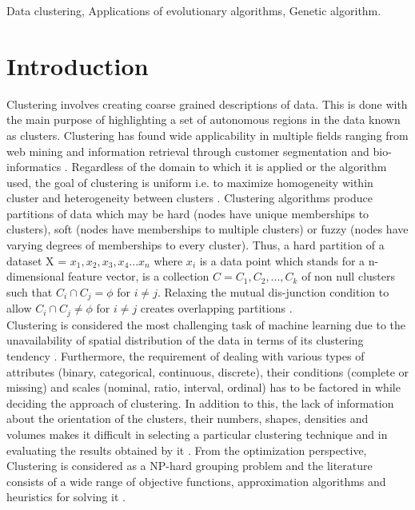 \documentclass[conference]{IEEEtran}
\begin{document}
\begin{IEEEkeywords}Data clustering, Applications of evolutionary algorithms, Genetic
algorithm.    
\end{IEEEkeywords}



%
\IEEEpeerreviewmaketitle



\section{Introduction}
Clustering involves creating coarse grained descriptions of data. This is done with the main purpose of highlighting a set of autonomous regions in the data known as clusters. Clustering has found wide applicability in multiple fields ranging from web mining and information retrieval through customer segmentation and bio-informatics \cite{hur}. Regardless of the domain to which it is applied or the algorithm used, the goal of clustering is uniform i.e. to maximize homogeneity within cluster and heterogeneity between clusters \cite{cha}. Clustering algorithms produce partitions of data which may be hard (nodes have unique memberships to clusters), soft (nodes have memberships to multiple clusters) or fuzzy (nodes have varying degrees of memberships to every cluster). Thus, a hard partition of a dataset X = ${x_1, x_2, x_3, x_4 ... x_n}$ where $x_i$ is a data point which stands for a n-dimensional feature vector, is a collection $C = {C_1, C_2, ... , C_k}$ of non null clusters such that $C_i \cap C_j = \phi$ for $ i \neq j$. Relaxing the mutual dis-junction condition to allow $C_i \cap C_j \neq \phi$ for $ i \neq j$ creates overlapping partitions \cite{ma}. \\

Clustering is considered the most challenging task of machine learning due to the unavailability of spatial distribution of the data in terms of its clustering tendency \cite{hur} \cite{cha} \cite{ma}. Furthermore, the requirement of dealing with various types of attributes (binary, categorical, continuous, discrete), their conditions (complete or missing) and scales (nominal, ratio, interval, ordinal) has to be factored in while deciding the approach of clustering.  In addition to this, the lack of information about the orientation of the clusters, their numbers, shapes, densities and volumes makes it difficult in selecting a particular clustering technique and in evaluating the results obtained by it \cite{val1} \cite{val2}. From the optimization perspective, Clustering is considered as a NP-hard grouping problem and the literature consists of a wide range of objective functions, approximation algorithms and heuristics for solving it \cite{hur}.\\
\end{document}
